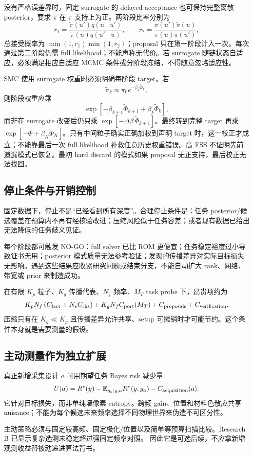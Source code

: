 没有严格误差界时，固定 surrogate 的 delayed acceptance 也可保持完整离散 posterior，要求 $\widetilde\pi$ 在 $\pi$ 支持上为正。两阶段比率分别为
\[
r_1=\frac{\widetilde\pi(u')q(u\mid u')}
{\widetilde\pi(u)q(u'\mid u)},\qquad
r_2=\frac{\pi(u')\widetilde\pi(u)}
{\pi(u)\widetilde\pi(u')},
\]
总接受概率为 $\min(1,r_1)\min(1,r_2)$；proposal 只在第一阶段计入一次。每次通过第二阶段仍需 full likelihood；不能声称无代价。若 surrogate 随链状态自适应，必须满足相应自适应 MCMC 条件或分阶段冻结，不得随意忽略适应性。

SMC 使用 surrogate 权重时必须明确每阶段 target。若
\[
\widetilde\pi_k\propto\pi_0e^{-\beta_k\widetilde\Phi_k},
\]
则阶段权重应乘
\[
\exp[-\beta_{k+1}\widetilde\Phi_{k+1}
+\beta_k\widetilde\Phi_k],
\]
而非在 surrogate 改变后仍只乘 $\exp[-\Delta\beta\,\widetilde\Phi_{k+1}]$。最终转到完整 target 再乘
$\exp[-\Phi+\beta_K\widetilde\Phi_K]$。只有中间粒子确实正确加权到声明 target 时，这一校正才成立；不能靠最后一次 full likelihood 补救任意历史权重错误。高 ESS 不证明先前遗漏模式已恢复。最初 hard discard 的模式如果 proposal 无正支持，最后校正无法找回。

\subsection{停止条件与开销控制}
固定数据下，停止不是“已经看到所有深度”。合理停止条件是：任务 posterior/候选覆盖在预算内不再有经核验改进；压缩风险低于任务容差；或者现有数据已给出无法降低的任务歧义见证。

每个阶段都可触发 NO-GO：full solver 已比 ROM 更便宜；任务稳定裕度过小导致证书无用；posterior 模式质量无法参考验证；发现的传播差异对实际目标损失无影响。遇到这些结果应收紧研究问题或结束分支，不能自动扩大 rank、网络、带宽或 prior 来制造成功。

在有限 $K_p$ 粒子、$K_g$ 传播代表、$N_f$ 频率、$M_T$ task probe 下，昂贵项约为
\[
K_pN_f\left(C_{\rm fact}+N_sC_{\rm rhs}\right)
+K_gN_f C_{\rm port}(M_T)
+C_{\rm proposals}+C_{\rm verification}.
\]
压缩只有在 $K_g\ll K_p$ 且传播差异允许共享、setup 可摊销时才可能节约。这个条件本身就是需要测量的假设。

\subsection{主动测量作为独立扩展}
真正新增采集设计 $a$ 可用期望任务 Bayes risk 减少量
\[
U(a)=R^*(y)-\mathbb E_{y_a\mid y,a}R^*(y,y_a)-C_{\rm acquisition}(a).
\]
它针对目标损失，而非单纯墙像素 entropy。跨频 gain、位置和材料色散应共享 nuisance；不能为每个候选未来频率选择不同物理世界来伪造不可区分性。

主动策略必须与固定较高频、固定极化/位置以及简单等预算扫描比较。Research B 已显示复杂选测未稳定超过强固定频率对照。\cite{R_B} 因此它是可选后续，不应拿新增观测收益替被动递进算法背书。


